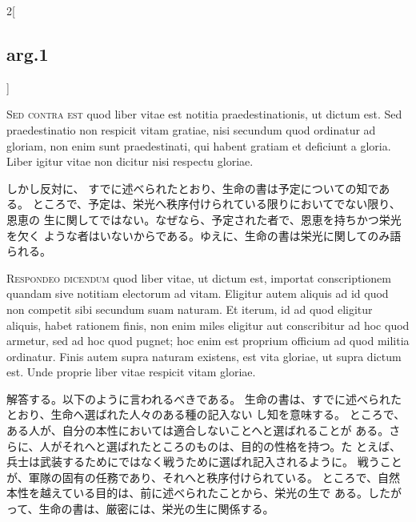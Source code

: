 \documentclass[paper=a4paper,fontsize=10pt,jafontsize=9pt,titlepage]{jlreq}
\begin{document}
\begin{paracol}{2}[\subsection{arg.1}]
\switchcolumn*[\subsection{s.c.}]

{\scshape Sed contra est} quod liber vitae est notitia
 praedestinationis, ut dictum est. Sed praedestinatio non respicit vitam
 gratiae, nisi secundum quod ordinatur ad gloriam, non enim sunt
 praedestinati, qui habent gratiam et deficiunt a gloria. Liber igitur
 vitae non dicitur nisi respectu gloriae.

\switchcolumn

しかし反対に、
すでに述べられたとおり、生命の書は予定についての知である。
ところで、予定は、栄光へ秩序付けられている限りにおいてでない限り、恩恵の
 生に関してではない。なぜなら、予定された者で、恩恵を持ちかつ栄光を欠く
 ような者はいないからである。ゆえに、生命の書は栄光に関してのみ語られる。


{\scshape Respondeo dicendum} quod liber vitae, ut dictum
 est, importat conscriptionem quandam sive notitiam electorum ad
 vitam. Eligitur autem aliquis ad id quod non competit sibi secundum
 suam naturam. Et iterum, id ad quod eligitur aliquis, habet rationem
 finis, non enim miles eligitur aut conscribitur ad hoc quod armetur,
 sed ad hoc quod pugnet; hoc enim est proprium officium ad quod militia
 ordinatur. Finis autem supra naturam existens, est vita gloriae, ut
 supra dictum est. Unde proprie liber vitae respicit vitam gloriae.

\switchcolumn

解答する。以下のように言われるべきである。
生命の書は、すでに述べられたとおり、生命へ選ばれた人々のある種の記入ない
 し知を意味する。
ところで、ある人が、自分の本性においては適合しないことへと選ばれることが
 ある。さらに、人がそれへと選ばれたところのものは、目的の性格を持つ。た
 とえば、兵士は武装するためにではなく戦うために選ばれ記入されるように。
 戦うことが、軍隊の固有の任務であり、それへと秩序付けられている。
ところで、自然本性を越えている目的は、前に述べられたことから、栄光の生で
 ある。したがって、生命の書は、厳密には、栄光の生に関係する。

\switchcolumn*[\subsection{ad.1}]


\end{paracol}
\end{document}
